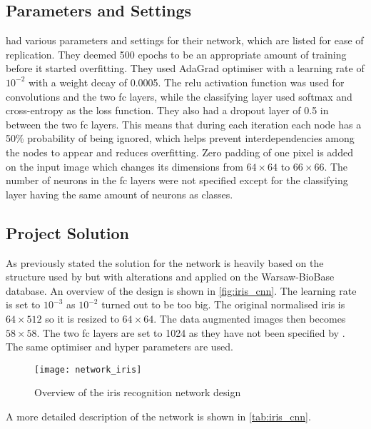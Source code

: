 \subsection{Parameters and Settings}
\cite{Al-Waisy2017} had various parameters and settings for their network, which are listed for ease of replication. They deemed 500 epochs to be an appropriate amount of training before it started overfitting. They used AdaGrad optimiser with a learning rate of $10^{-2}$ with a weight decay of 0.0005. The \gls{relu} activation function was used for convolutions and the two \gls{fc} layers, while the classifying layer used softmax and cross-entropy as the loss function. They also had a dropout layer of 0.5 in between the two \gls{fc} layers. This means that during each iteration each node has a 50\% probability of being ignored, which helps prevent interdependencies among the nodes to appear and reduces overfitting. Zero padding of one pixel is added on the input image which changes its dimensions from $64\times64$ to $66\times66$. The number of neurons in the \gls{fc} layers were not specified except for the classifying layer having the same amount of neurons as classes. 

\subsection{Project Solution}

As previously stated the solution for the network is heavily based on the structure used by \cite{Al-Waisy2017} but with alterations and applied on the Warsaw-BioBase database. An overview of the design is shown in \autoref{fig:iris_cnn}. The learning rate is set to $10^{-3}$ as $10^{-2}$ turned out to be too big. The original normalised iris is $64\times 512$ so it is resized to $64\times64$. The data augmented images then becomes $58\times58$. The two \gls{fc} layers are set to 1024 as they have not been specified by \cite{Al-Waisy2017}. The same optimiser and hyper parameters are used.

\begin{figure}[H]
	\centering
	\texttt{[image: network\_iris]}
	\caption{Overview of the iris recognition network design}
	\label{fig:iris_cnn}
\end{figure}

A more detailed description of the network is shown in \autoref{tab:iris_cnn}.

